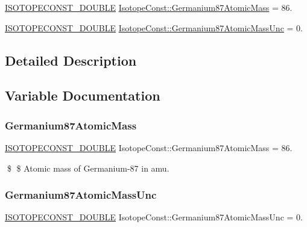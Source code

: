 \begin{DoxyCompactItemize}
\item 
\mbox{\hyperlink{group___isotope_const-_macros_ga8f45a7272ce02c0b4c65c44636ed719a}{I\+S\+O\+T\+O\+P\+E\+C\+O\+N\+S\+T\+\_\+\+D\+O\+U\+B\+LE}} \mbox{\hyperlink{group___isotope_const-_germanium-_ge87_ga038fccc8bd9c71ae953a158a54a3ade5}{Isotope\+Const\+::\+Germanium87\+Atomic\+Mass}} = 86.
\item 
\mbox{\hyperlink{group___isotope_const-_macros_ga8f45a7272ce02c0b4c65c44636ed719a}{I\+S\+O\+T\+O\+P\+E\+C\+O\+N\+S\+T\+\_\+\+D\+O\+U\+B\+LE}} \mbox{\hyperlink{group___isotope_const-_germanium-_ge87_ga7f6df1b361ed49b72d06c326aa5bf662}{Isotope\+Const\+::\+Germanium87\+Atomic\+Mass\+Unc}} = 0.
\end{DoxyCompactItemize}


\subsection{Detailed Description}


\subsection{Variable Documentation}
\mbox{\label{group___isotope_const-_germanium-_ge87_ga038fccc8bd9c71ae953a158a54a3ade5}} 
\subsubsection{\texorpdfstring{Germanium87\+Atomic\+Mass}{Germanium87AtomicMass}}
{\footnotesize\ttfamily \mbox{\hyperlink{group___isotope_const-_macros_ga8f45a7272ce02c0b4c65c44636ed719a}{I\+S\+O\+T\+O\+P\+E\+C\+O\+N\+S\+T\+\_\+\+D\+O\+U\+B\+LE}} Isotope\+Const\+::\+Germanium87\+Atomic\+Mass = 86.}

\$ \$ Atomic mass of Germanium-\/87 in amu. \mbox{\label{group___isotope_const-_germanium-_ge87_ga7f6df1b361ed49b72d06c326aa5bf662}} 
\subsubsection{\texorpdfstring{Germanium87\+Atomic\+Mass\+Unc}{Germanium87AtomicMassUnc}}
{\footnotesize\ttfamily \mbox{\hyperlink{group___isotope_const-_macros_ga8f45a7272ce02c0b4c65c44636ed719a}{I\+S\+O\+T\+O\+P\+E\+C\+O\+N\+S\+T\+\_\+\+D\+O\+U\+B\+LE}} Isotope\+Const\+::\+Germanium87\+Atomic\+Mass\+Unc = 0.}

